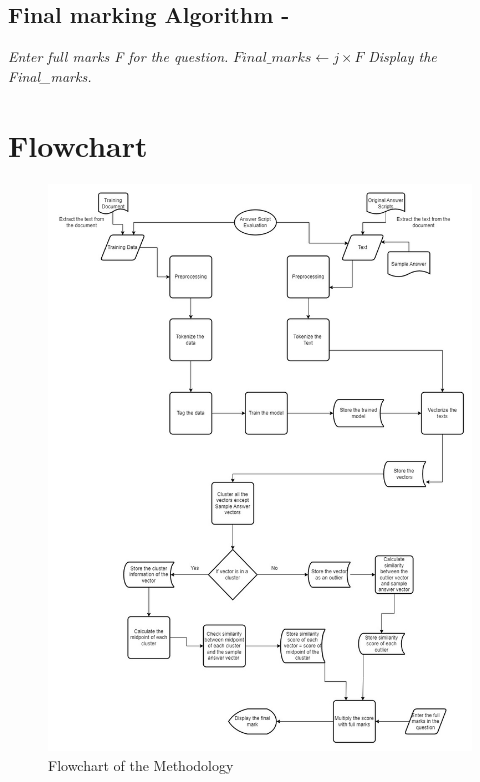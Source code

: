 \subsection{Final marking Algorithm -}
\begin{algorithmic}[1]
    \State \textit{Enter full marks F for the question.}
        \State $Final\_marks \gets j \times F$
    \EndFor
    \State \textit{Display the Final\_marks.}
\end{algorithmic}

    \newpage
\section{Flowchart}
   \begin{figure}[H]
       \centering
       \includegraphics[width=1\linewidth]{IMAGE/flowchart.jpeg}
       \caption{Flowchart of the Methodology}
       \label{Flowchart}
   \end{figure}

